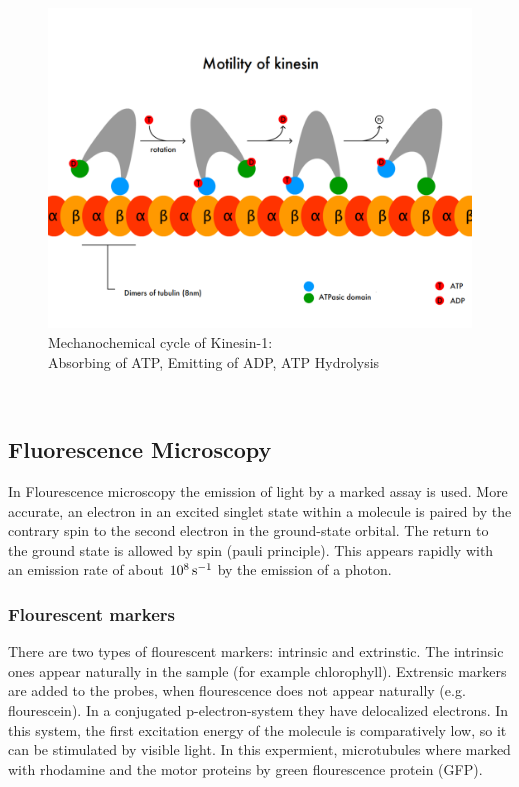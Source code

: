 		\begin{figure}[h]
				 			\centering
				 		   	\captionsetup{justification=centering}            
				 		    	  \includegraphics[scale=0.3]{pic/kinesin.png}
				 		    \caption{Mechanochemical cycle of Kinesin-1:\\ Absorbing of ATP, Emitting of ADP, ATP Hydrolysis\cite{wikiKinesin}}
				 		   	\label{int:kinesin} 
				\end{figure}\\
	\subsection{Fluorescence Microscopy}
       In Flourescence microscopy the emission of light by a marked assay is used. More accurate, an electron in an excited singlet state within a molecule is paired by the contrary spin to the second electron in the ground-state orbital. The return to the ground state is allowed by spin (pauli principle). This appears rapidly with an emission rate of about $\unit[10^8]{s^{-1}}$ by the emission of a photon.
        \subsubsection{Flourescent markers}
            There are two types of flourescent markers: intrinsic and extrinstic. The intrinsic ones appear naturally in the sample (for example chlorophyll). Extrensic markers are added to the probes, when flourescence does not appear naturally (e.g. flourescein).
            In a conjugated p-electron-system they have delocalized electrons. In this system, the first excitation energy of the molecule is comparatively low, so it can be stimulated by visible light.
            In this expermient, microtubules where marked with rhodamine and the motor proteins by green flourescence protein (GFP).
